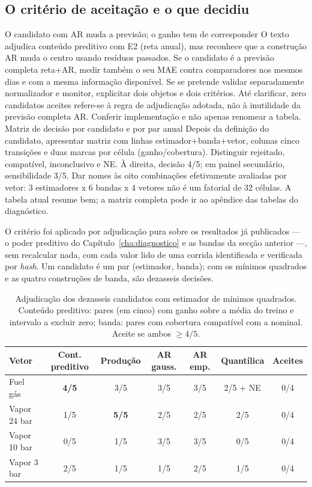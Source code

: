 \subsection{O critério de aceitação e o que decidiu}
\label{sec:demo-gate}
{O candidato com AR muda a previsão; o ganho tem de corresponder}
{O texto adjudica conteúdo preditivo com E2 (reta anual), mas reconhece
que a construção AR muda o centro usando resíduos passados. Se o
candidato é a previsão completa reta+AR, medir também o seu MAE contra
comparadores nos mesmos dias e com a mesma informação disponível.
Se se pretende validar separadamente normalizador e monitor, explicitar
dois objetos e dois critérios. Até clarificar, zero candidatos aceites
refere-se à regra de adjudicação adotada, não à inutilidade da previsão
completa AR. Conferir implementação e não apenas renomear a tabela.}%
{Matriz de decisão por candidato e por par anual}
{Depois da definição do candidato, apresentar matriz com linhas
estimador+banda+vetor, colunas cinco transições e duas marcas por célula
(ganho/cobertura). Distinguir rejeitado, compatível, inconclusivo e NE.
À direita, decisão 4/5; em painel secundário, sensibilidade 3/5.
Dar nomes às oito combinações efetivamente avaliadas por vetor:
3 estimadores x 6 bandas x 4 vetores não é um fatorial de 32 células.
A tabela atual resume bem; a matriz completa pode ir ao apêndice das tabelas do diagnóstico.}%

O critério foi aplicado por adjudicação pura sobre os resultados já
publicados --- o poder preditivo do Capítulo~\ref{cha:diagnostico} e as
bandas da secção anterior ---, sem recalcular nada, com cada valor lido de
uma corrida identificada e verificada por \emph{hash}. Um candidato é um par
(estimador, banda); com os mínimos quadrados e as quatro construções de
banda, são dezasseis decisões.

\begin{table}[htbp]
  \centering
  \caption[Critério de aceitação: candidatos de mínimos quadrados]{Adjudicação
  dos dezasseis candidatos com estimador de mínimos quadrados. Conteúdo
  preditivo: pares (em cinco) com ganho sobre a média do treino e intervalo a
  excluir zero; banda: pares com cobertura compatível com a nominal. Aceite
  se ambos $\geq 4/5$.}
  \label{tab:gate}
  \small
  \begin{tabular}{lcccccc}
    \toprule
    Vetor & Cont. preditivo & Produção & AR gauss. & AR emp. & Quantílica & Aceites \\
    \midrule
    Fuel gás     & \textbf{4/5} & 3/5 & 3/5 & 3/5 & 2/5 + NE & 0/4 \\
    Vapor 24 bar & 1/5 & \textbf{5/5} & 2/5 & 2/5 & 2/5 & 0/4 \\
    Vapor 10 bar & 0/5 & 1/5 & 3/5 & 3/5 & 0/5 & 0/4 \\
    Vapor 3 bar  & 2/5 & 1/5 & 1/5 & 2/5 & 1/5 & 0/4 \\
    \bottomrule
  \end{tabular}
\end{table}

